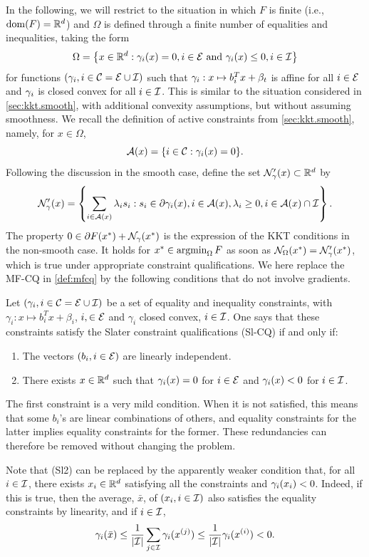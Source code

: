 In the following, we will restrict to the situation in which $F$ is finite (i.e., $\mathrm{dom}(F) = {\mathbb{R}}^d$) and $\Omega$ is defined through a finite number of equalities and inequalities, taking the form
\[
\Omega = \left\{ x\in {\mathbb{R}}^d: \gamma_i(x) = 0, i\in {\mathcal E} \text{ and } \gamma_i(x) \leq 0, i\in{\mathcal I} \right\}
\]
for functions $(\gamma_i, i\in {\mathcal C} = {\mathcal E}\cup{\mathcal I})$ such that  $\gamma_i:x \mapsto b_i^Tx +\beta_t$ is affine 
for all $i\in{\mathcal E}$ and $\gamma_i$ is closed convex for all $i\in {\mathcal I}$. This is similar to the situation considered in \cref{sec:kkt.smooth}, with additional convexity assumptions, but without assuming smoothness. We recall the definition of active constraints from \cref{sec:kkt.smooth}, namely, for $x\in \Omega$, 
\[
{\mathcal A}(x) = \{i\in {\mathcal C}: \gamma_i(x) = 0\}.
\]
Following the discussion in the smooth case, define the set ${\mathcal N}'_\gamma(x)\subset {\mathbb{R}}^d$ by
\[
{\mathcal N}'_\gamma(x) = \left\{\sum_{i\in {\mathcal A}(x)} \lambda_i s_i: s_i\in \partial \gamma_i(x), i\in {\mathcal A}(x), \lambda_i \geq 0, i\in {\mathcal A}(x) \cap {\mathcal I}\right \}.
\]
The property $0 \in \partial F(x^*) + {\mathcal N}_\gamma(x^*)$ is the expression of the KKT conditions in the non-smooth case. It holds for $x^*\in \operatorname*{argmin}_\Omega F$ as soon as ${\mathcal N}_\Omega(x^*) = {\mathcal N}'_\gamma(x^*)$, which is true under appropriate constraint qualifications. We here replace the MF-CQ in \cref{def:mfcq} by the following conditions that do not involve gradients.
\begin{definition}
\label{def:slater}
Let $(\gamma_i, i\in {\mathcal C} = {\mathcal E}\cup{\mathcal I})$ be a set of equality and inequality constraints, with $\gamma_i: x\mapsto b_i^T x + \beta_i$, $i, \in{\mathcal E}$ and $\gamma_i$ closed convex, $i\in{\mathcal I}$. One says that these constraints satisfy the Slater constraint qualifications (Sl-CQ) if and only if:
\begin{enumerate}[label=(Sl\,\arabic*)]
\item The vectors $(b_i, i\in{\mathcal E})$ are linearly independent.
\item There exists $x\in {\mathbb{R}}^d$ such that $\gamma_i(x) = 0$ for $i\in{\mathcal E}$ and $\gamma_i(x) < 0$ for $i\in{\mathcal I}$.
\end{enumerate}
\end{definition}
The first constraint is a very mild condition. When it is not satisfied, this means that some $b_i$'s are linear combinations of others, and equality constraints for the latter implies equality constraints for the former. These redundancies can therefore be removed without changing the problem.

Note that (Sl2) can be replaced by the apparently weaker condition that, for all $i\in {\mathcal I}$, there exists $x_i\in {\mathbb{R}}^d$ satisfying all the constraints and $\gamma_i(x_i) < 0$.  Indeed, if this is true, then the average, $\bar x$, of $(x_i, i\in{\mathcal I})$ also satisfies the equality constraints by linearity, and if $i\in {\mathcal I}$, 
\[
\gamma_i(\bar x) \leq \frac1{|{\mathcal I}|} \sum_{j\in{\mathcal I}} \gamma_{i}(x^{(j)}) \leq \frac1{|{\mathcal I}|} \gamma_{i}(x^{(i)}) < 0.
\]

